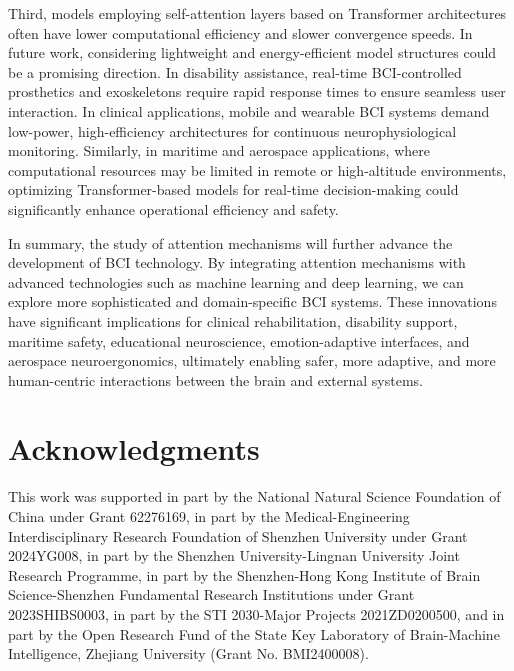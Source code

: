 \documentclass[preprint,12pt]{elsarticle}
\begin{document}
Third, models employing self-attention layers based on Transformer architectures often have lower computational efficiency and slower convergence speeds. In future work, considering lightweight and energy-efficient model structures could be a promising direction. In disability assistance, real-time BCI-controlled prosthetics and exoskeletons require rapid response times to ensure seamless user interaction. In clinical applications, mobile and wearable BCI systems demand low-power, high-efficiency architectures for continuous neurophysiological monitoring. Similarly, in maritime and aerospace applications, where computational resources may be limited in remote or high-altitude environments, optimizing Transformer-based models for real-time decision-making could significantly enhance operational efficiency and safety.

In summary, the study of attention mechanisms will further advance the development of BCI technology. By integrating attention mechanisms with advanced technologies such as machine learning and deep learning, we can explore more sophisticated and domain-specific BCI systems. These innovations have significant implications for clinical rehabilitation, disability support, maritime safety, educational neuroscience, emotion-adaptive interfaces, and aerospace neuroergonomics, ultimately enabling safer, more adaptive, and more human-centric interactions between the brain and external systems.

\section{Acknowledgments}
This work was supported in part by the National Natural Science Foundation of China under Grant 62276169, in part by the Medical-Engineering Interdisciplinary Research Foundation of Shenzhen University under Grant 2024YG008, in part by the Shenzhen University-Lingnan University Joint Research Programme, in part by the Shenzhen-Hong Kong Institute of Brain Science-Shenzhen Fundamental Research Institutions under Grant 2023SHIBS0003, in part by the STI 2030-Major Projects 2021ZD0200500, and in part by the Open Research Fund of the State Key Laboratory of Brain-Machine Intelligence, Zhejiang University (Grant No. BMI2400008).




\end{document}
